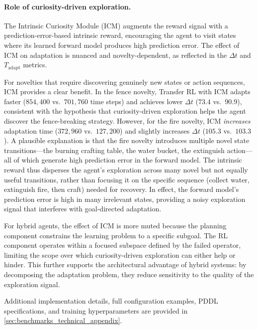 \paragraph{Role of curiosity-driven exploration.} The Intrinsic Curiosity Module (ICM) augments the reward signal with a prediction-error-based intrinsic reward, encouraging the agent to visit states where its learned forward model produces high prediction error. The effect of ICM on adaptation is nuanced and novelty-dependent, as reflected in the $\Delta t$ and $T_\text{adapt}$ metrics.

For novelties that require discovering genuinely new states or action sequences, ICM provides a clear benefit. In the fence novelty, Transfer RL with ICM adapts faster ($854{,}400$ vs.\ $701{,}760$ time steps) and achieves lower $\Delta t$ ($73.4$ vs.\ $90.9$), consistent with the hypothesis that curiosity-driven exploration helps the agent discover the fence-breaking strategy. However, for the fire novelty, ICM \emph{increases} adaptation time ($372{,}960$ vs.\ $127{,}200$) and slightly increases $\Delta t$ ($105.3$ vs.\ $103.3$). A plausible explanation is that the fire novelty introduces multiple novel state transitions---the burning crafting table, the water bucket, the extinguish action---all of which generate high prediction error in the forward model. The intrinsic reward thus disperses the agent's exploration across many novel but not equally useful transitions, rather than focusing it on the specific sequence (collect water, extinguish fire, then craft) needed for recovery. In effect, the forward model's prediction error is high in many irrelevant states, providing a noisy exploration signal that interferes with goal-directed adaptation.

For hybrid agents, the effect of ICM is more muted because the planning component constrains the learning problem to a specific subgoal. The RL component operates within a focused subspace defined by the failed operator, limiting the scope over which curiosity-driven exploration can either help or hinder. This further supports the architectural advantage of hybrid systems: by decomposing the adaptation problem, they reduce sensitivity to the quality of the exploration signal.



Additional implementation details, full configuration examples, PDDL specifications, and training hyperparameters are provided in \cref{sec:benchmarks_technical_appendix}.

